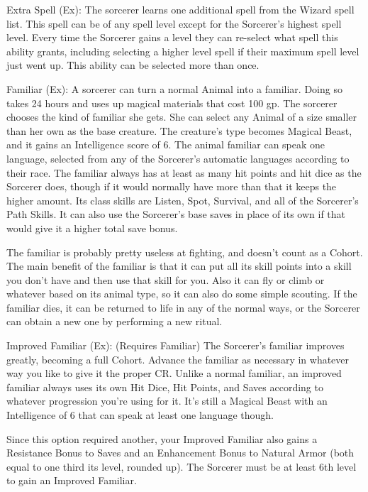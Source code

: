\begin{description*}
\item[Extra Spell (Ex):] The sorcerer learns one additional spell from the Wizard spell list. This spell can be of any spell level except for the Sorcerer's highest spell level. Every time the Sorcerer gains a level they can re-select what spell this ability grants, including selecting a higher level spell if their maximum spell level just went up. This ability can be selected more than once.

\item[Familiar (Ex):] A sorcerer can turn a normal Animal into a familiar. Doing so takes 24 hours and uses up magical materials that cost 100 gp. The sorcerer chooses the kind of familiar she gets. She can select any Animal of a size smaller than her own as the base creature. The creature's type becomes Magical Beast, and it gains an Intelligence score of 6. The animal familiar can speak one language, selected from any of the Sorcerer's automatic languages according to their race. The familiar always has at least as many hit points and hit dice as the Sorcerer does, though if it would normally have more than that it keeps the higher amount. Its class skills are Listen, Spot, Survival, and all of the Sorcerer's Path Skills. It can also use the Sorcerer's base saves in place of its own if that would give it a higher total save bonus.

The familiar is probably pretty useless at fighting, and doesn't count as a Cohort. The main benefit of the familiar is that it can put all its skill points into a skill you don't have and then use that skill for you. Also it can fly or climb or whatever based on its animal type, so it can also do some simple scouting. If the familiar dies, it can be returned to life in any of the normal ways, or the Sorcerer can obtain a new one by performing a new ritual.

\item[Improved Familiar (Ex):] (Requires Familiar) The Sorcerer's familiar improves greatly, becoming a full Cohort. Advance the familiar as necessary in whatever way you like to give it the proper CR. Unlike a normal familiar, an improved familiar always uses its own Hit Dice, Hit Points, and Saves according to whatever progression you're using for it. It's still a Magical Beast with an Intelligence of 6 that can speak at least one language though.

Since this option required another, your Improved Familiar also gains a Resistance Bonus to Saves and an Enhancement Bonus to Natural Armor (both equal to one third its level, rounded up). The Sorcerer must be at least 6th level to gain an Improved Familiar.


\end{description*}
